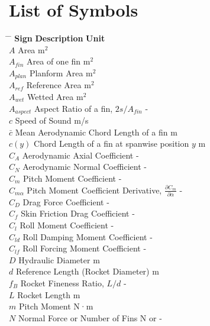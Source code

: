 \section*{List of Symbols}
\begin{tabbing}
    \hspace{3cm} \= \hspace{9cm} \= \hspace{9cm} \kill
    \textbf{Sign} \> \textbf{Description} \> \textbf{Unit} \\
    $A$ \> Area \> m$^2$ \\
    $A_{fin}$ \> Area of one fin \> m$^2$ \\
    $A_{plan}$ \> Planform Area \> m$^2$ \\
    $A_{ref}$ \> Reference Area \> m$^2$ \\
    $A_{wet}$ \> Wetted Area \> m$^2$ \\
    $A_{aspect}$ \> Aspect Ratio of a fin, $2s / A_{fin}$ \> - \\
    $c$ \> Speed of Sound \> m/s \\
    $\bar{c}$ \> Mean Aerodynamic Chord Length of a fin \> m \\
    $c(y)$ \> Chord Length of a fin at spanwise position $y$ \> m \\
    $C_A$ \> Aerodynamic Axial Coefficient \> - \\
    $C_N$ \> Aerodynamic Normal Coefficient \> - \\
    $C_m$ \> Pitch Moment Coefficient \> - \\
    $C_{m\alpha}$ \> Pitch Moment Coefficient Derivative, $\frac{\partial C_m}{\partial \alpha}$ \> - \\
    $C_D$ \> Drag Force Coefficient \> - \\
    $C_f$ \> Skin Friction Drag Coefficient \> - \\
    $C_l$ \> Roll Moment Coefficient \> - \\
    $C_{ld}$ \> Roll Damping Moment Coefficient \> - \\
    $C_{lf}$ \> Roll Forcing Moment Coefficient \> - \\
    $D$ \> Hydraulic Diameter \> m \\
    $d$ \> Reference Length (Rocket Diameter) \> m \\
    $f_B$ \> Rocket Fineness Ratio, $L/d$ \> - \\
    $L$ \> Rocket Length \> m \\
    $m$ \> Pitch Moment \> N·m \\
    $N$ \> Normal Force or Number of Fins \> N or - \\

\end{tabbing}

